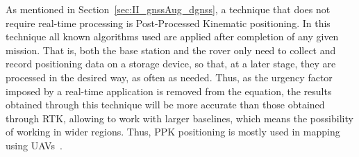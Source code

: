 As mentioned in Section~\ref{sec:II_gnssAug_dgnss}, a technique that does not require real-time processing is Post-Processed Kinematic positioning. In this technique all known algorithms used are applied after completion of any given mission. That is, both the base station and the rover only need to collect and record positioning data on a storage device, so that, at a later stage, they are processed in the desired way, as often as needed. Thus, as the urgency factor imposed by a real-time application is removed from the equation, the results obtained through this technique will be more accurate than those obtained through RTK, allowing to work with larger baselines, which means the possibility of working in wider regions.
Thus, PPK positioning is mostly used in mapping using UAVs~\cite{novatel_gnss}.


